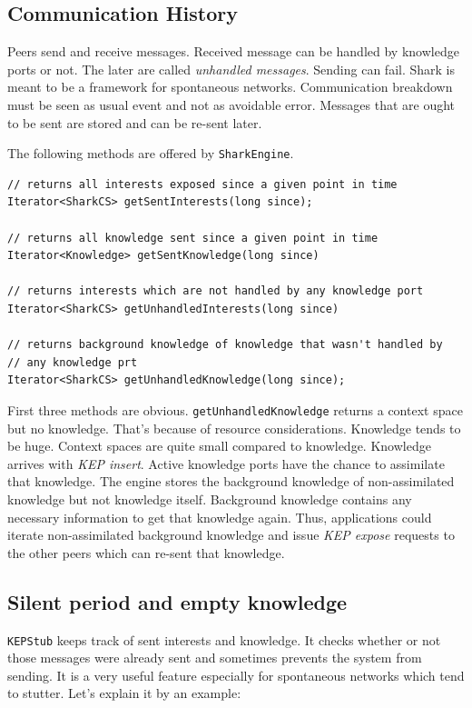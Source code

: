 \subsection{Communication History}
Peers send and receive messages. Received message can be handled by knowledge ports or not. The later are called {\it unhandled messages}. Sending can fail. Shark is meant to be a framework for spontaneous networks. Communication breakdown must be seen as usual event and not as avoidable error. Messages that are ought to be sent are stored and can be re-sent later.

The following methods are offered by {\tt SharkEngine}.

\begin{verbatim}
// returns all interests exposed since a given point in time
Iterator<SharkCS> getSentInterests(long since);

// returns all knowledge sent since a given point in time
Iterator<Knowledge> getSentKnowledge(long since)
  
// returns interests which are not handled by any knowledge port
Iterator<SharkCS> getUnhandledInterests(long since)

// returns background knowledge of knowledge that wasn't handled by
// any knowledge prt
Iterator<SharkCS> getUnhandledKnowledge(long since);
\end{verbatim}

First three methods are obvious. {\tt getUnhandledKnowledge} returns a context space but no knowledge. That's because of resource considerations. Knowledge tends to be huge. Context spaces are quite small compared to knowledge. Knowledge arrives with {\it KEP insert}. Active knowledge ports have the chance to assimilate that knowledge. The engine stores the background knowledge of non-assimilated knowledge but not knowledge itself. Background knowledge contains any necessary information to get that knowledge again. Thus, applications could iterate non-assimilated background knowledge and issue {\it KEP expose} requests to the other peers which can re-sent that knowledge.

\subsection{Silent period and empty knowledge}
{\tt KEPStub} keeps track of sent interests and knowledge. It checks whether 
or not those messages were already sent and sometimes prevents the system from sending. 
It is a very useful feature especially for spontaneous networks which tend to stutter. Let's explain it by an example:

